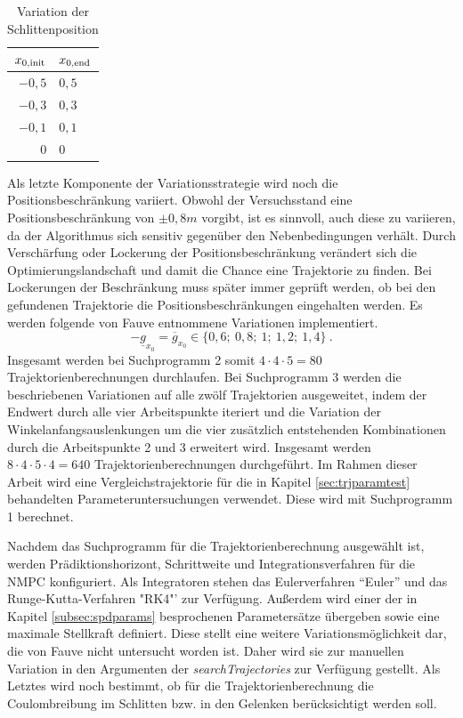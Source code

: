 \begin{table}[h]
	\centering
		\begin{tabular}{r|l}
			$x_{0\mathrm{,init}}$ & $x_{0\mathrm{,end}}$ \\
			\midrule
			$-0,5$ & $0,5$	\\	
			$-0,3$ & $0,3$	\\	
			$-0,1$ & $0,1$	\\	
			   $0$ &   $0$	\\
			
		\end{tabular}
	\caption{Variation der Schlittenposition}
	\label{tab:varpos}
\end{table}

Als letzte Komponente der Variationsstrategie wird noch die Positionsbeschränkung variiert. Obwohl der Versuchsstand eine Positionsbeschränkung von $\pm0,8m$ vorgibt, ist es sinnvoll, auch diese zu variieren, da der Algorithmus sich sensitiv gegenüber den Nebenbedingungen verhält. Durch Verschärfung oder Lockerung der Positionsbeschränkung verändert sich die Optimierungslandschaft und damit die Chance eine Trajektorie zu finden. Bei Lockerungen der Beschränkung muss später immer geprüft werden, ob bei den gefundenen Trajektorie die Positionsbeschränkungen eingehalten werden. Es werden folgende von Fauve \cite{fauve} entnommene Variationen implementiert.
	\[
	-\underline{g}_{x_0} = \overline{g}_{x_0} \in \{ 0,6; \ 0,8; \ 1; \ 1,2; \ 1,4 \}  \ .
\]
Insgesamt werden bei Suchprogramm 2 somit $4 \cdot 4 \cdot 5 = 80$ Trajektorienberechnungen durchlaufen. Bei Suchprogramm 3 werden die beschriebenen Variationen auf alle zwölf Trajektorien ausgeweitet, indem der Endwert durch alle vier Arbeitspunkte iteriert und die Variation der Winkelanfangsauslenkungen um die vier zusätzlich entstehenden Kombinationen durch die Arbeitspunkte 2 und 3 erweitert wird. Insgesamt werden $8 \cdot 4 \cdot 5 \cdot 4 = 640$ Trajektorienberechnungen durchgeführt.
Im Rahmen dieser Arbeit wird eine Vergleichstrajektorie für die in Kapitel \ref{sec:trjparamtest} behandelten Parameteruntersuchungen verwendet. Diese wird mit Suchprogramm 1 berechnet.

Nachdem das Suchprogramm für die Trajektorienberechnung ausgewählt ist, werden Prädiktionshorizont, Schrittweite und Integrationsverfahren für die NMPC konfiguriert. Als Integratoren stehen das Eulerverfahren "`Euler"' und das Runge-Kutta-Verfahren "RK4"' zur Verfügung. Außerdem wird einer der in Kapitel \ref{subsec:spdparams} besprochenen Parametersätze übergeben sowie eine maximale Stellkraft definiert. Diese stellt eine weitere Variationsmöglichkeit dar, die von Fauve \cite{fauve} nicht untersucht worden ist. Daher wird sie zur manuellen Variation in den Argumenten der \textit{searchTrajectories} zur Verfügung gestellt.
Als Letztes wird noch bestimmt, ob für die Trajektorienberechnung die Coulombreibung im Schlitten bzw. in den Gelenken berücksichtigt werden soll. 

